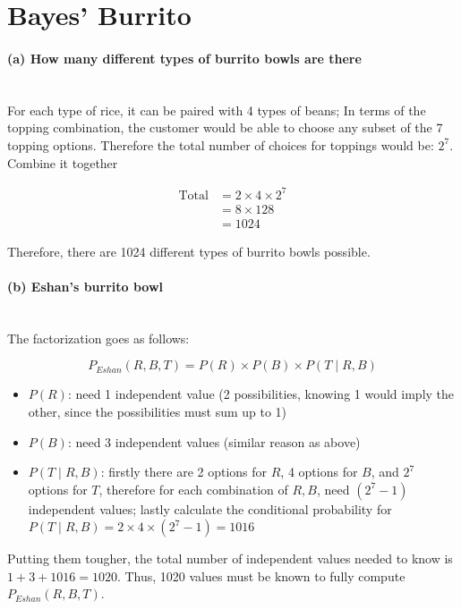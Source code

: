 \documentclass[12pt,letterpaper]{article}
\begin{document}
\section*{Bayes' Burrito}


\paragraph{(a) How many different types of burrito bowls are there}  \mbox{}\\

For each type of rice, it can be paired with 4 types of beans; In terms of the topping combination, the customer would be able to choose any subset of the 7 topping options. Therefore the total number of choices for toppings would be: $2^{7}$. Combine it together

\begin{align*}
    \text{Total} &= 2 \times 4 \times 2^{7} \\
                 &= 8 \times 128 \\
                 &= 1024
\end{align*}

Therefore, there are 1024 different types of burrito bowls possible.


\paragraph{(b) Eshan's burrito bowl}  \mbox{}\\

The factorization goes as follows: 

$$ P_{Eshan}(R, B, T) = P(R) \times  P(B) \times P(T \mid R, B) $$

\begin{itemize}
    \item $P(R)$: need 1 independent value (2 possibilities, knowing 1 would imply the other, since the possibilities must sum up to 1)
    \item $P(B)$: need 3 independent values (similar reason as above)
    \item $P(T \mid R, B)$: firstly there are 2 options for $R$, 4 options for $B$, and $2^{7}$ options for $T$, therefore for each combination of $R, B$, need $(2^{7} - 1)$ independent values; lastly calculate the conditional probability for $P(T \mid R, B) = 2 \times 4 \times (2^{7} - 1) = 1016$
\end{itemize}

Putting them tougher, the total number of independent values needed to know is $1 + 3 + 1016  = 1020$. Thus, 1020 values must be known to fully compute $P_{Eshan}(R, B, T)$.
\end{document}
